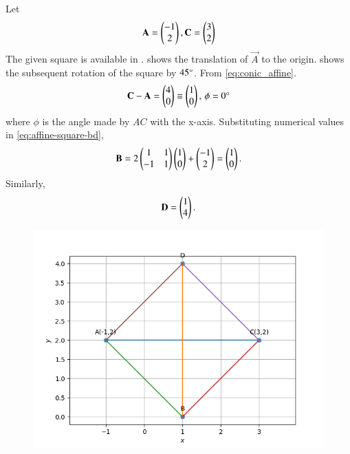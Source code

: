 Let
\begin{align}
\mathbf{A} = \begin{pmatrix}
-1 \\
 2\\
\end{pmatrix},
\mathbf{C} = 
\begin{pmatrix}
3\\
2\\
\end{pmatrix}
\end{align}
The given square is available in .
 shows the translation of $\vec{A}$ to the origin. 
 shows the subsequent rotation of the square by $45\degree$.
From
	\eqref{eq:conic_affine}.
\begin{align}
\mathbf{C} - \mathbf{A} = \begin{pmatrix}
4\\
0
\end{pmatrix} \equiv 
\begin{pmatrix}
1\\
0
\end{pmatrix},\,
\phi= 0\degree
\end{align}
		where
$\phi$ is the angle made by $AC$ with the x-axis.
Substituting numerical values in 
	\eqref{eq:affine-square-bd},
\begin{align}
	\mathbf{B}
	=2\begin{pmatrix}1 & 1 \\ -1 & 1\end{pmatrix}\begin{pmatrix}1\\0\end{pmatrix}+
\begin{pmatrix}
-1 \\
 2\\
\end{pmatrix}
=
\begin{pmatrix}
1\\
0
\end{pmatrix}.
		\end{align}
		Similarly,
\begin{align}
\mathbf{D} = 
\begin{pmatrix}
1\\
4
\end{pmatrix}.
\end{align}
\begin{figure}[!ht]
	\begin{center} 
	    \includegraphics[width=\columnwidth]{chapters/10/7/4/4/figs/square}
	\end{center}
\caption{}
\label{fig:7/4/4/4Fig1}
\end{figure}
